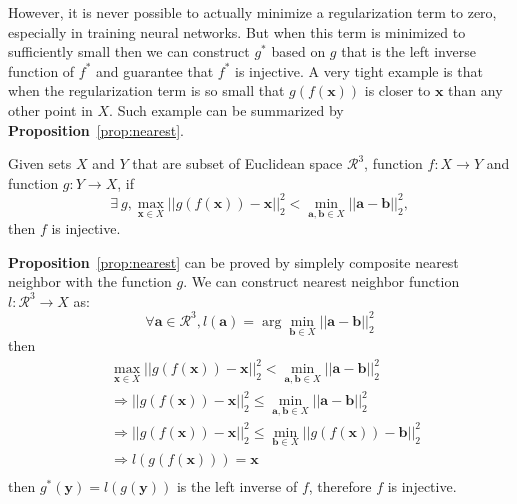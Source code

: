 However, it is never possible to actually minimize a regularization term to zero, especially in training neural networks. But when this term is minimized to sufficiently small then we can construct $g^*$ based on $g$ that is the left inverse function of $f^*$ and guarantee that $f^*$ is injective. A very tight example is that when the regularization term is so small that $g(f(\mathbf{x}))$ is closer to $\mathbf{x}$ than any other point in $X$. Such example can be summarized by \textbf{Proposition}~\ref{prop:nearest}.

\begin{m_prop}
	\label{prop:nearest}
	Given sets $X$ and $Y$ that are subset of Euclidean space $\mathcal{R}^3$, function $f:X \rightarrow Y$  and function $g:Y \rightarrow X$, if
	\begin{equation}
	\exists~g, \max_{\mathbf{x}\in X}|| g(f(\mathbf{x})) - \mathbf{x} ||_2^2 < \min_{\mathbf{a},\mathbf{b} \in X}|| \mathbf{a} - \mathbf{b} ||_2^2,
	\end{equation}
	then $f$ is injective.
\end{m_prop}

\textbf{Proposition}~\ref{prop:nearest} can be proved by simplely composite nearest neighbor with the function $g$. We can construct nearest neighbor function $l: \mathcal{R}^3 \rightarrow X $ as:
\begin{equation}
\forall \mathbf{a} \in \mathcal{R}^3, l(\mathbf{a}) = \arg\min_{\mathbf{b} \in X} || \mathbf{a} - \mathbf{b} ||_2^2
\end{equation}
then
\begin{equation}
\begin{aligned}
&\max_{\mathbf{x}\in X}|| g(f(\mathbf{x})) - \mathbf{x} ||_2^2 < \min_{\mathbf{a},\mathbf{b} \in X}|| \mathbf{a} - \mathbf{b} ||_2^2\\
&\Rightarrow || g(f(\mathbf{x})) - \mathbf{x} ||_2^2 \leq \min_{\mathbf{a},\mathbf{b} \in X}|| \mathbf{a} - \mathbf{b} ||_2^2\\
&\Rightarrow || g(f(\mathbf{x})) - \mathbf{x} ||_2^2 \leq \min_{\mathbf{b} \in X}|| g(f(\mathbf{x})) - \mathbf{b} ||_2^2\\
&\Rightarrow l(g(f(\mathbf{x}))) = \mathbf{x}\\
\end{aligned}
\end{equation}
then $g^*(\mathbf{y}) = l(g(\mathbf{y}))$ is the left inverse of $f$, therefore $f$ is injective.

